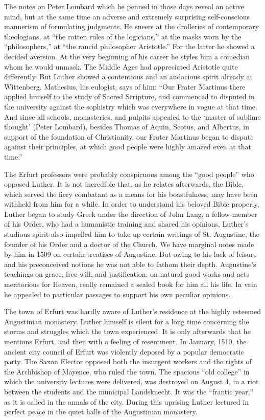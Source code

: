 The notes on Peter Lombard which he penned in those days reveal
an active mind, but at the same time an adverse and extremely surprising
self-conscious mannerism of formulating judgments. He
sneers at the drolleries of contemporary theologians, at “the rotten
rules of the logicians,” at the masks worn by the “philosophers,”
at “the rancid philosopher Aristotle.” For the latter he showed a decided
aversion. At the very beginning of his career he styles him a
comedian whom he would unmask. The Middle Ages had appreciated
Aristotle quite differently. But Luther showed a contentious and an
audacious spirit already at Wittenberg. Mathesius, his eulogist, says
of him: “Our Frater Martinus there applied himself to the study of
Sacred Scripture, and commenced to disputed in the university against
the sophistry which was everywhere in vogue at that time. And since
all schools, monasteries, and pulpits appealed to the ‘master of
sublime thought’ (Peter Lombard), besides Thomas of Aquin, Scotus,
and Albertus, in support of the foundation of Christianity, our
Frater Martinus began to dispute against their principles, at which
good people were highly amazed even at that time.”

The Erfurt professors were probably conspicuous among the “good
people” who opposed Luther. It is not incredible that, as he relates
afterwards, the Bible, which served the fiery combatant as a means
for his boastfulness, may have been withheld from him for a while.
In order to understand his beloved Bible properly, Luther began to
study Greek under the direction of John Lang, a fellow-member
of his Order, who had a humanistic training and shared his opinions,
Luther’s studious spirit also impelled him to take up certain writings
of St. Augustine, the founder of his Order and a doctor of the
Church. We have marginal notes made by him in 1509 on certain
treatises of Augustine. But owing to his lack of leisure and his preconceived
notions he was not able to fathom their depth. Augustine’s
teachings on grace, free will, and justification, on natural good works
and acts meritorious for Heaven, really remained a sealed book for
him all his life. In vain he appealed to particular passages to support
his own peculiar opinions.

The town of Erfurt was hardly aware of Luther’s residence at the
highly esteemed Augustinian monastery. Luther himself is silent for
a long time concerning the storms and struggles which the town
experienced. It is only afterwards that he mentions Erfurt, and then
with a feeling of resentment. In January, 1510, the ancient city
council of Erfurt was violently deposed by a popular democratic
party. The Saxon Elector opposed both the insurgent workers and
the rights of the Archbishop of Mayence, who ruled the town. The
spacious “old college” in which the university lectures were delivered,
was destroyed on August 4, in a riot between the students and the
municipal Landsknecht. It was the “frantic year,” as it is called in the
annals of the city. During this uprising Luther lectured in perfect
peace in the quiet halls of the Augustinian monastery.

